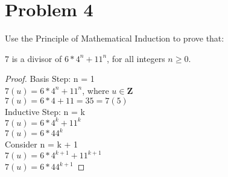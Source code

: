 \documentclass{article}
\newenvironment{problem}[1]{
  \nobreak\section*{Problem #1}
}{}
\begin{document}
  \begin{problem}{4}
    Use the Principle of Mathematical Induction to prove that:
    \begin{center}
      $7$ is a divisor of $6 * 4^n + 11^n$, for all integers $n \ge 0$.
    \end{center}
    \begin{proof}
      Basis Step: n = 1\\
      $7(u) = 6 * 4^n + 11^n$, where $u \in \mathbf{Z}$\\
      $7(u) = 6 * 4 + 11 = 35 = 7(5)$\\
      Inductive Step: n = k\\
      $7(u) = 6 * 4^k + 11^k$\\
      $7(u) = 6 * 44^k$\\
      Consider n = k + 1\\
      $7(u) = 6 * 4^{k + 1} + 11^{k + 1}$\\
      $7(u) = 6 * 44^{k + 1}$
    \end{proof}
  \end{problem}
\end{document}
